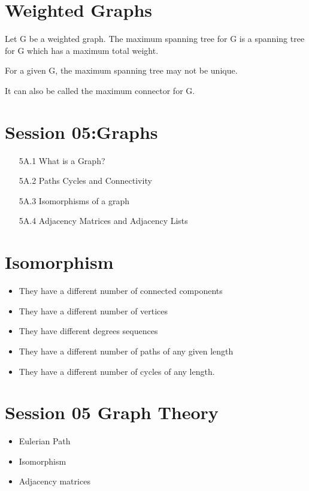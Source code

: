 \documentclass[]{report}
\begin{document}
\section*{Weighted Graphs}
Let G be a weighted graph.
The maximum spanning tree for G is a spanning tree for G which has a maximum total weight.

For a given G, the maximum spanning tree may not be unique.

It can also be called the maximum connector for G.


\section*{Session 05:Graphs}
\begin{itemize}
\item[5A.1] What is a Graph?
\item[5A.2] Paths Cycles and Connectivity
\item[5A.3] Isomorphisms of a graph
\item[5A.4] Adjacency Matrices and Adjacency Lists
\end{itemize}


\section{Isomorphism}
\begin{itemize}
\item They have a different number of connected components
\item They have a different number of vertices
\item They have different degrees sequences
\item They have a different number of paths of any given length
\item They have a different number of cycles of any length.
\end{itemize}




\section*{Session 05 Graph Theory}
\begin{itemize}
	\item Eulerian Path
	\item Isomorphism
	\item Adjacency matrices
\end{itemize}
\end{document}
